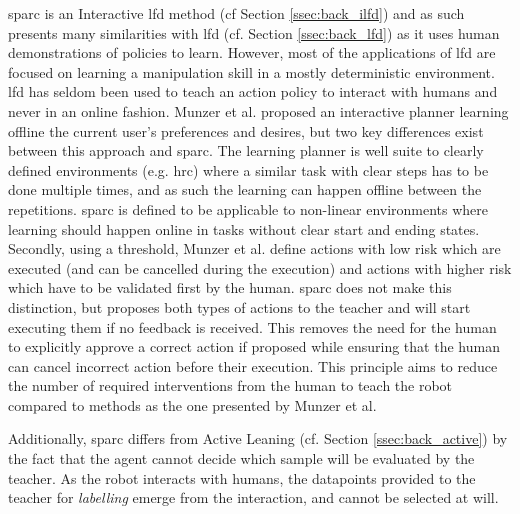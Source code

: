 \gls{sparc} is an Interactive \gls{lfd} method (cf Section \ref{ssec:back_ilfd}) and as such presents many similarities with \acrlong{lfd} (cf. Section \ref{ssec:back_lfd}) as it uses human demonstrations of policies to learn. However, most of the applications of \gls{lfd} \citep{argall2009survey,billard2008robot} are focused on learning a manipulation skill in a mostly deterministic environment. \gls{lfd} has seldom been used to teach an action policy to interact with humans \citep{liu2014train,sequeira2016discovering,munzer2017efficient} and never in an online fashion. Munzer et al. proposed an interactive planner learning offline the current user's preferences and desires, but two key differences exist between this approach and \gls{sparc}. The learning planner is well suite to clearly defined environments (e.g. \gls{hrc}) where a similar task with clear steps has to be done multiple times, and as such the learning can happen offline between the repetitions. \gls{sparc} is defined to be applicable to non-linear environments where learning should happen online in tasks without clear start and ending states. Secondly, using a threshold, Munzer et al. define actions with low risk which are executed (and can be cancelled during the execution) and actions with higher risk which have to be validated first by the human. \gls{sparc} does not make this distinction, but proposes both types of actions to the teacher and will start executing them if no feedback is received. This removes the  need for the human to explicitly approve a correct action if proposed while ensuring that the human can cancel incorrect action before their execution. This principle aims to reduce the number of required interventions from the human to teach the robot compared to methods as the one presented by Munzer et al. 

Additionally, \gls{sparc} differs from Active Leaning (cf. Section \ref{ssec:back_active}) by the fact that the agent cannot decide which sample will be evaluated by the teacher. As the robot interacts with humans, the datapoints provided to the teacher for \textit{labelling} emerge from the interaction, and cannot be selected at will. 
    

